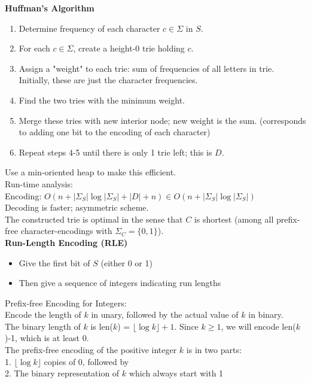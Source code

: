 \documentclass[12pt]{article}
\begin{document}
{\textbf{Huffman's Algorithm}
\begin{enumerate}
	\item Determine frequency of each character $c\in \Sigma$ in $S$.
	\item For each $c\in\Sigma$, create a height-0 trie holding $c$.
	\item Assign a "weight" to each trie: sum of frequencies of all letters in trie. Initially, these are just the character frequencies.
	\item Find the two tries with the minimum weight.
	\item Merge these tries with new interior node; new weight is the sum. (corresponds to adding one bit to the encoding of each character)
	\item Repeat steps 4-5 until there is only 1 trie left; this is $D$.
\end{enumerate}
Use a min-oriented heap to make this efficient. \\

Run-time analysis:\\
Encoding:
$O(n+|\Sigma_S|\log|\Sigma_S| + |D| + n) \in O(n+|\Sigma_S|\log|\Sigma_S|)$\\
Decoding is faster; asymmetric scheme.\\
The constructed trie is optimal in the sense that $C$ is shortest (among all prefix-free character-encodings with $\Sigma_C=\{0,1\}$). \\

\textbf{Run-Length Encoding (RLE)}
\begin{itemize}
	\renewcommand\labelitemi{--}
	\item Give the first bit of $S$ (either 0 or 1)
	\item Then give a sequence of integers indicating run lengths
\end{itemize}

Prefix-free Encoding for Integers:\\
Encode the length of $k$ in unary, followed by the actual value of $k$ in binary.\\
The binary length of $k$ is len($k$) = $\lfloor\log k\rfloor + 1$. Since $k\geq 1$, we will encode len($k$)-1, which is at least 0.\\
The prefix-free encoding of the positive integer $k$ is in two parts:\\
1. $\lfloor\log k\rfloor$ copies of 0, followed by\\
2. The binary representation of $k$ which always start with 1\\

}
\end{document}
